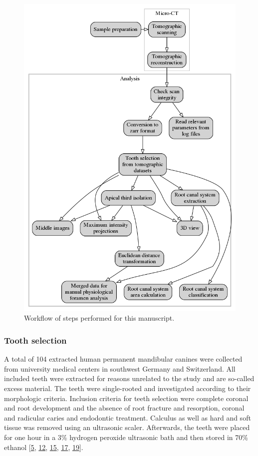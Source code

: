 \documentclass[
  american,
]{article}
\begin{document}
\begin{figure}
\hypertarget{fig:workflow}{%
\centering
\includegraphics{images/workflow.png}
\caption{Workflow of steps performed for this manuscript.}\label{fig:workflow}
}
\end{figure}

\hypertarget{tooth-selection}{%
\subsubsection{Tooth selection}\label{tooth-selection}}

A total of 104 extracted human permanent mandibular canines were collected from university medical centers in southwest Germany and Switzerland.
All included teeth were extracted for reasons unrelated to the study and are so-called excess material.
The teeth were single-rooted and investigated according to their morphologic criteria.
Inclusion criteria for teeth selection were complete coronal and root development and the absence of root fracture and resorption, coronal and radicular caries and endodontic treatment.
Calculus as well as hard and soft tissue was removed using an ultrasonic scaler.
Afterwards, the teeth were placed for one hour in a 3\% hydrogen peroxide ultrasonic bath and then stored in 70\% ethanol {[}\protect\hyperlink{ref-1HkTk4VKM}{5}, \protect\hyperlink{ref-OttTicsv}{12}, \protect\hyperlink{ref-amSKhLb1}{15}, \protect\hyperlink{ref-ZTgDEakx}{17}, \protect\hyperlink{ref-1Gn1pVZXt}{19}{]}.
\end{document}
